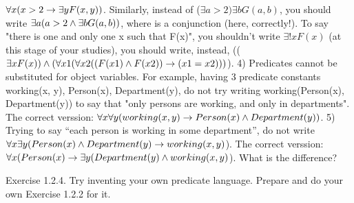 \(\forall x(x>2\rightarrow \exists yF(x,y))\). Similarly, instead of (\(\exists a>2)\exists bG(a,b)\), you should write \(\exists a(a>2\wedge \exists bG(a,b))\), where
\AND  is a conjunction (here, correctly!).
To say "there is one and only one x such that F(x)", you shouldn't write \(\exists !x F(x)\) (at this stage of your
studies), you should write, instead, ((\(\exists xF(x))\wedge (\forall x1(\forall x2((F(x1)\wedge F(x2))\rightarrow (x1=x2)))\)).
4) Predicates cannot be substituted for object variables. For example, having 3 predicate constants
working(x, y), Person(x), Department(y), do not try writing working(Person(x), Department(y)) to say
that "only persons are working, and only in departments". The correct verssion: \(\forall x\forall y(working(x, y)\rightarrow Person(x)\wedge Department(y))\).
5) Trying to say ``each person is working in some department'', do not write
\(\forall x\exists y(Person(x)\wedge Department(y)\rightarrow working(x,y)\)). The correct verssion:
\(\forall x(Person(x)\rightarrow \exists y(Department(y)\wedge working(x,y)\)). What is the difference?

Exercise 1.2.4. Try inventing your own predicate language. Prepare and do your own Exercise 1.2.2 for it.

